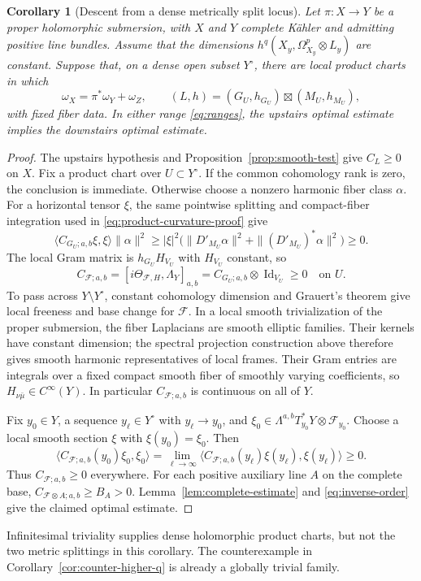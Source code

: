 \documentclass[11pt,reqno]{amsart}
\numberwithin{equation}{section}
\newtheorem{corollary}[theorem]{Corollary}
\theoremstyle{definition}
\theoremstyle{remark}
\newcommand{\Id}{\operatorname{Id}}
\begin{document}
\begin{corollary}[Descent from a dense metrically split locus]
\label{cor:dense-product-descent}
Let $\pi:X\to Y$ be a proper holomorphic submersion, with $X$ and
$Y$ complete K\"ahler and admitting positive line bundles.  Assume
that the dimensions $h^q(X_y,\Omega_{X_y}^p\otimes L_y)$ are constant.
Suppose that, on a dense open subset $Y^\circ$, there are local
product charts in which
\[
 \omega_X=\pi^*\omega_Y+\omega_Z,\qquad
 (L,h)=(G_U,h_{G_U})\boxtimes(M_U,h_{M_U}),
\]
with fixed fiber data.  In either range \eqref{eq:ranges}, the
upstairs optimal estimate implies the downstairs optimal estimate.
\end{corollary}
\begin{proof}
The upstairs hypothesis and Proposition~\ref{prop:smooth-test}
give $C_L\ge0$ on $X$.  Fix a product chart over $U\subset Y^\circ$.
If the common cohomology rank is zero, the conclusion is immediate.
Otherwise choose a nonzero harmonic fiber class $\alpha$.  For a horizontal tensor
$\xi$, the same pointwise splitting and compact-fiber integration
used in \eqref{eq:product-curvature-proof} give
\[
 \langle C_{G_U;a,b}\xi,\xi\rangle\|\alpha\|^2
 \ge|\xi|^2\bigl(\|D'_{M_U}\alpha\|^2+
                         \|(D'_{M_U})^*\alpha\|^2\bigr)\ge0.
\]
The local Gram matrix is $h_{G_U}H_{V_U}$ with $H_{V_U}$ constant,
so
\[
 C_{\mathcal F;a,b}
   =[i\Theta_{\mathcal F,H},\Lambda_Y]_{a,b}
   =C_{G_U;a,b}\otimes\Id_{V_U}\ge0\quad\text{on }U.
\]
To pass across $Y\setminus Y^\circ$, constant cohomology dimension
and Grauert's theorem give local freeness and base change for
$\mathcal F$.  In a local smooth trivialization of the proper
submersion, the fiber Laplacians are smooth elliptic families.
Their kernels have constant dimension; the spectral projection
construction above therefore gives smooth harmonic representatives
of local frames.  Their Gram entries are integrals over a fixed
compact smooth fiber of smoothly varying coefficients, so
$H_{\nu\bar\mu}\in C^\infty(Y)$.  In particular
$C_{\mathcal F;a,b}$ is continuous on all of $Y$.

Fix $y_0\in Y$, a sequence $y_\ell\in Y^\circ$ with $y_\ell\to y_0$,
and $\xi_0\in\Lambda^{a,b}T_{y_0}^*Y\otimes\mathcal F_{y_0}$.
Choose a local smooth section $\xi$ with $\xi(y_0)=\xi_0$.  Then
\[
 \langle C_{\mathcal F;a,b}(y_0)\xi_0,\xi_0\rangle
 =\lim_{\ell\to\infty}
   \langle C_{\mathcal F;a,b}(y_\ell)\xi(y_\ell),\xi(y_\ell)\rangle
 \ge0 .
\]
Thus $C_{\mathcal F;a,b}\ge0$ everywhere.  For each positive
auxiliary line $A$ on the complete base,
$C_{\mathcal F\otimes A;a,b}\ge B_A>0$.
Lemma~\ref{lem:complete-estimate} and
\eqref{eq:inverse-order} give the claimed optimal estimate.
\end{proof}
Infinitesimal triviality supplies dense holomorphic product charts,
but not the two metric splittings in this corollary.  The
counterexample in Corollary~\ref{cor:counter-higher-q} is already a
globally trivial family.
\end{document}
